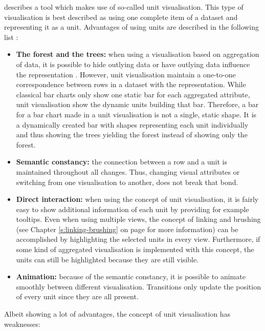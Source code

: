 \citeauthor{Drucker2015} describes a tool which makes use of so-called unit visualisation. This type of visualisation is best described as using one complete item of a dataset and representing it as a unit. Advantages of using units are described in the following list :
\begin{itemize}
\item \textbf{The forest and the trees:} when using a visualisation based on aggregation of data, it is possible to hide outlying data or have outlying data influence the representation . However, unit visualisation maintain a one-to-one correspondence between rows in a dataset with the representation. While classical bar charts only show one static bar for each aggregated attribute, unit visualisation show the dynamic units building that bar. Therefore, a bar for a bar chart made in a unit visualisation is not a single, static shape. It is a dynamically created bar with shapes representing each unit individually and thus showing the trees yielding the forest instead of showing only the forest.

\item \textbf{Semantic constancy:} the connection between a row and a unit is maintained throughout all changes. Thus, changing visual attributes or switching from one visualisation to another, does not break that bond.

\item \textbf{Direct interaction:} when using the concept of unit visualisation, it is fairly easy to show additional information of each unit by providing for example tooltips. Even when using multiple views, the concept of linking and brushing (see Chapter \ref{s:linking-brushing} on page \pageref{s:linking-brushing} for more information) can be accomplished by highlighting the selected units in every view. Furthermore, if some kind of aggregated visualisation is implemented with this concept, the units can still be highlighted because they are still visible.

\item \textbf{Animation:} because of the semantic constancy, it is possible to animate smoothly between different visualisation. Transitions only update the position of every unit since they are all present.

\end{itemize}

Albeit showing a lot of advantages, the concept of unit visualisation has weaknesses:

